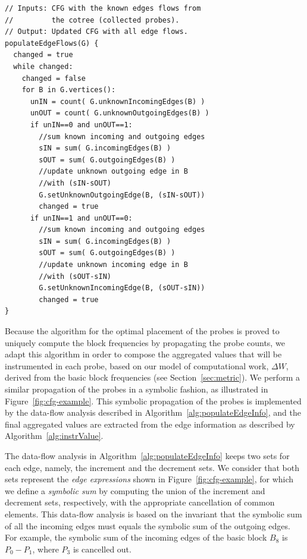 \documentclass[sigplan,10pt]{acmart}
\begin{document}
\begin{lstlisting}[caption={Post-processing of the CFG for populating all edge flows based on the collected probes.}, label={lst:populateEdgeFlows}, float]
// Inputs: CFG with the known edges flows from
//         the cotree (collected probes).
// Output: Updated CFG with all edge flows.
populateEdgeFlows(G) {
  changed = true
  while changed:
    changed = false
    for B in G.vertices():
      unIN = count( G.unknownIncomingEdges(B) )
      unOUT = count( G.unknownOutgoingEdges(B) )
      if unIN==0 and unOUT==1:
        //sum known incoming and outgoing edges
        sIN = sum( G.incomingEdges(B) )
        sOUT = sum( G.outgoingEdges(B) )
        //update unknown outgoing edge in B
        //with (sIN-sOUT)
        G.setUnknownOutgoingEdge(B, (sIN-sOUT))
        changed = true
      if unIN==1 and unOUT==0:
        //sum known incoming and outgoing edges
        sIN = sum( G.incomingEdges(B) )
        sOUT = sum( G.outgoingEdges(B) )
        //update unknown incoming edge in B
        //with (sOUT-sIN)
        G.setUnknownIncomingEdge(B, (sOUT-sIN))
        changed = true
}
\end{lstlisting}


Because the algorithm for the optimal placement of the probes is proved to uniquely compute the block frequencies by propagating the probe counts, we adapt this algorithm in order to compose the aggregated values that will be instrumented in each probe, based on our model of computational work, $\Delta W$, derived from the basic block frequencies (see Section~\ref{sec:metric}).
We perform a similar propagation of the probes in a symbolic fashion, as illustrated in Figure~\ref{fig:cfg-example}.
This symbolic propagation of the probes is implemented by the data-flow analysis described in Algorithm~\ref{alg:populateEdgeInfo}, and the final aggregated values are extracted from the edge information as described by Algorithm~\ref{alg:instrValue}.

The data-flow analysis in Algorithm~\ref{alg:populateEdgeInfo} keeps two sets for each edge, namely, the increment and the decrement sets.
We consider that both sets represent the \textit{edge expressions} shown in Figure~\ref{fig:cfg-example}, for which we define a \textit{symbolic sum} by computing the union of the increment and decrement sets, respectively, with the appropriate cancellation of common elements.
This data-flow analysis is based on the invariant that the symbolic sum of all the incoming edges must equals the symbolic sum of the outgoing edges.
For example, the symbolic sum of the incoming edges of the basic block $B_8$ is $P_0 - P_1$, where $P_3$ is cancelled out.
\end{document}

